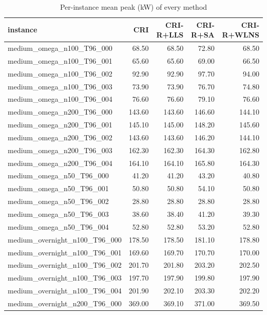 \begin{table}[htbp]
\centering
\small
\caption{Per-instance mean peak (kW) of every method}
\label{tab:E5b_ablation_60s_b60_per_instance}
\begin{tabular}{lrrrr}
\toprule
instance & CRI & CRI-R+LLS & CRI-R+SA & CRI-R+WLNS \\
\midrule
medium\_omega\_n100\_T96\_000 & 68.50 & 68.50 & 72.80 & 68.50 \\
medium\_omega\_n100\_T96\_001 & 65.60 & 65.60 & 69.00 & 66.50 \\
medium\_omega\_n100\_T96\_002 & 92.90 & 92.90 & 97.70 & 94.00 \\
medium\_omega\_n100\_T96\_003 & 73.90 & 73.90 & 76.70 & 74.80 \\
medium\_omega\_n100\_T96\_004 & 76.60 & 76.60 & 79.10 & 76.60 \\
medium\_omega\_n200\_T96\_000 & 143.60 & 143.60 & 146.60 & 144.10 \\
medium\_omega\_n200\_T96\_001 & 145.10 & 145.00 & 148.20 & 145.60 \\
medium\_omega\_n200\_T96\_002 & 143.60 & 143.60 & 146.20 & 144.10 \\
medium\_omega\_n200\_T96\_003 & 162.30 & 162.30 & 164.30 & 162.80 \\
medium\_omega\_n200\_T96\_004 & 164.10 & 164.10 & 165.80 & 164.30 \\
medium\_omega\_n50\_T96\_000 & 41.20 & 41.20 & 43.20 & 40.80 \\
medium\_omega\_n50\_T96\_001 & 50.80 & 50.80 & 54.10 & 50.80 \\
medium\_omega\_n50\_T96\_002 & 28.80 & 28.80 & 28.80 & 28.80 \\
medium\_omega\_n50\_T96\_003 & 38.60 & 38.40 & 41.20 & 39.30 \\
medium\_omega\_n50\_T96\_004 & 52.80 & 52.80 & 53.20 & 52.80 \\
medium\_overnight\_n100\_T96\_000 & 178.50 & 178.50 & 181.10 & 178.80 \\
medium\_overnight\_n100\_T96\_001 & 169.60 & 169.70 & 170.70 & 170.00 \\
medium\_overnight\_n100\_T96\_002 & 201.70 & 201.80 & 203.20 & 202.50 \\
medium\_overnight\_n100\_T96\_003 & 197.70 & 197.90 & 199.80 & 197.90 \\
medium\_overnight\_n100\_T96\_004 & 201.90 & 202.10 & 203.30 & 202.20 \\
medium\_overnight\_n200\_T96\_000 & 369.00 & 369.10 & 371.00 & 369.50 \\

\end{tabular}
\end{table}
